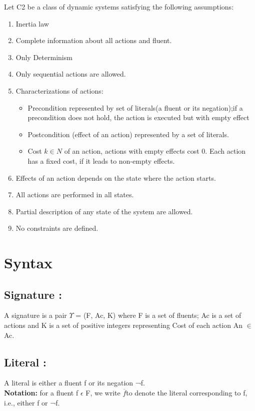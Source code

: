 \documentclass[11pt]{article}
\begin{document}
	Let C2 be a class of dynamic systems satisfying the following assumptions:
	\begin{enumerate}
		\item Inertia law
		\item Complete information about all actions and fluent. 
		\item Only Determinism
		\item Only sequential actions are allowed.
		\item Characterizations of actions:\begin{itemize}
			\item Precondition represented by set of literals(a fluent or its negation);if a precondition does not hold, the action is executed but with empty effect
			\item Postcondition (effect of an action) represented by a set of literals.
			\item Cost $k \in N $ of an action, actions with empty effects cost 0. Each action has a fixed cost, if it leads to non-empty effects. 
		\end{itemize}
		\item Effects of an action depends on the state where the action starts.
		\item All actions are performed in all states.
		\item Partial description of any state of the system are allowed.
		\item No constraints are defined.	 
	\end{enumerate}
	
	\section{Syntax}\label{sec:syntax}
	
	
	\subsection{Signature :}\label{sec:Signature} 

A signature is a pair $\Upsilon$ = (F, Ac, K) where F is a set of fluents; Ac is a set of actions and K is a set of positive integers representing Cost of each action An $\in$ Ac.

\subsection{Literal :}\label{sec:Literal} 

A literal is either a fluent f or its negation ¬f.\\
\textbf{Notation:} for a fluent f $\epsilon$ F, we write $\overline{f}$to denote the literal corresponding to f, i.e., either f or ¬f.
\end{document}
